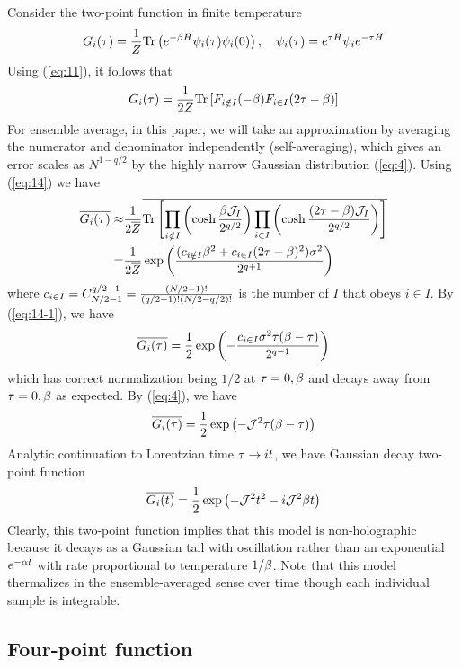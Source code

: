 \documentclass[11pt]{article}
\renewcommand{\>}{\rangle}
\newcommand{\<}{\langle}
\def\nn{\nonumber}
\begin{document}
Consider the two-point function in finite temperature
\begin{equation}
G_{i}(\tau)=\frac{1}{Z}\text{Tr}\left(e^{-\beta H}\psi_{i}(\tau)\psi_{i}(0)\right),\quad\psi_{i}(\tau)=e^{\tau H}\psi_{i}e^{-\tau H}
\end{equation}
Using (\ref{eq:11}), it follows that
\begin{equation}
G_{i}(\tau)=\frac{1}{2Z}\text{Tr}\left[F_{i\notin I}(-\beta)F_{i\in I}(2\tau-\beta)\right]
\end{equation}
For ensemble average, in this paper, we will take an approximation
by averaging the numerator and denominator independently (self-averaging), which gives
an error scales as $N^{1-q/2}$ by the highly narrow Gaussian distribution
(\ref{eq:4}). Using (\ref{eq:14}) we have
\begin{align}
\overline{G_{i}(\tau)}\app &\f 1{2\overline{Z}}\overline{\Tr\left[\prod_{i\notin I}\left(\cosh\f{\b\mJ_{I}}{2^{q/2}}\right)\prod_{i\in I}\left(\cosh\f{(2\tau-\b)\mJ_{I}}{2^{q/2}}\right)\right]}\nn\\
=&\f 1{2\overline{Z}}\exp\left(\f{(c_{i\notin I}\b^{2}+c_{i\in I}(2\tau-\b)^{2})\s^{2}}{2^{q+1}}\right)\label{eq:16}
\end{align}
where $c_{i\in I}=C_{N/2-1}^{q/2-1}=\frac{(N/2-1)!}{(q/2-1)!(N/2-q/2)!}$
is the number of $I$ that obeys $i\in I$. By (\ref{eq:14-1}), we
have 
\begin{equation}
\overline{G_{i}(\tau)}=\frac{1}{2}\exp\left(-\frac{c_{i\in I}\sigma^{2}\tau(\beta-\tau)}{2^{q-1}}\right)\label{eq:17}
\end{equation}
which has correct normalization being $1/2$ at $\tau=0,\beta$ and decays
away from $\tau=0,\beta$ as expected. By (\ref{eq:4}), we have 
\begin{equation}
\overline{G_{i}(\tau)}=\frac{1}{2}\exp\left(-\mathcal{J}^{2}\tau(\beta-\tau)\right)\label{eq:21}
\end{equation}
Analytic continuation to Lorentzian time $\tau\rightarrow it$, we have Gaussian
decay two-point function
\begin{equation}
\overline{G_{i}(t)}=\frac{1}{2}\exp\left(-\mathcal{J}^{2}t^{2}-i\mathcal{J}^{2}\beta t\right)
\end{equation}
Clearly, this two-point function implies that this model is non-holographic
because it decays as a Gaussian tail with oscillation rather than
an exponential $e^{-\alpha t}$ with rate proportional to temperature
$1/\beta$. Note that this model thermalizes in the ensemble-averaged
sense over time though each individual sample is integrable.

\subsection{Four-point function}
\end{document}
